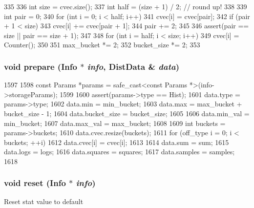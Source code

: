 \begin{DoxyCode}
335 {
336     int size = cvec.size();
337     int half = (size + 1) / 2; // round up!
338 
339     int pair = 0;
340     for (int i = 0; i < half; i++) {
341         cvec[i] = cvec[pair];
342         if (pair + 1 < size)
343             cvec[i] += cvec[pair + 1];
344         pair += 2;
345     }
346     assert(pair == size || pair == size + 1);
347 
348     for (int i = half; i < size; i++)
349         cvec[i] = Counter();
350 
351     max_bucket *= 2;
352     bucket_size *= 2;
353 }
\end{DoxyCode}
\hypertarget{classStats_1_1HistStor_a2e5e3cd36b4a3d6ab774aed4e3fcd641}{
\subsubsection[{prepare}]{\setlength{\rightskip}{0pt plus 5cm}void prepare ({\bf Info} $\ast$ {\em info}, \/  {\bf DistData} \& {\em data})}}
\label{classStats_1_1HistStor_a2e5e3cd36b4a3d6ab774aed4e3fcd641}



\begin{DoxyCode}
1597     {
1598         const Params *params = safe_cast<const Params *>(info->storageParams);
1599 
1600         assert(params->type == Hist);
1601         data.type = params->type;
1602         data.min = min_bucket;
1603         data.max = max_bucket + bucket_size - 1;
1604         data.bucket_size = bucket_size;
1605 
1606         data.min_val = min_bucket;
1607         data.max_val = max_bucket;
1608 
1609         int buckets = params->buckets;
1610         data.cvec.resize(buckets);
1611         for (off_type i = 0; i < buckets; ++i)
1612             data.cvec[i] = cvec[i];
1613 
1614         data.sum = sum;
1615         data.logs = logs;
1616         data.squares = squares;
1617         data.samples = samples;
1618     }
\end{DoxyCode}
\hypertarget{classStats_1_1HistStor_a10d9d71be6e0d2194999bb5dd5280e2d}{
\subsubsection[{reset}]{\setlength{\rightskip}{0pt plus 5cm}void reset ({\bf Info} $\ast$ {\em info})}}
\label{classStats_1_1HistStor_a10d9d71be6e0d2194999bb5dd5280e2d}
Reset stat value to default 



